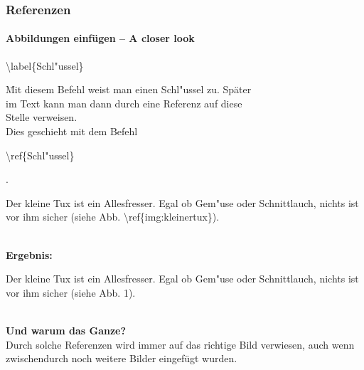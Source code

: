 
\begin{frame}
\frametitle{Referenzen}
\framesubtitle{Abbildungen einfügen – A closer look}
\begin{tabbing}
\begin{ttfamily}\color{nounibaredI}\textbackslash label\color{black}\{Schl"ussel\}\end{ttfamily} \= Mit diesem Befehl weist man einen Schl"ussel zu. Später\\
\> im Text kann man dann durch eine Referenz auf diese\\
\> Stelle verweisen.\\
\> Dies geschieht mit dem Befehl
\begin{ttfamily}\color{nounibaredI}\textbackslash ref\color{black}\{Schl"ussel\}\end{ttfamily}.
\end{tabbing}
\begin{ttfamily}Der kleine Tux ist ein Allesfresser. Egal ob Gem"use oder
Schnittlauch, nichts ist vor ihm sicher (siehe Abb.
\color{nounibaredI}\textbackslash ref\color{black}\{img:kleinertux\}).\end{ttfamily}\\[3mm]
\textbf{Ergebnis:}\\[3mm]
\begin{minipage}{\textwidth}\begin{rm}
Der kleine Tux ist ein Allesfresser. Egal ob Gem"use oder
Schnittlauch, nichts ist vor ihm sicher (siehe Abb.
1).\end{rm} \end{minipage}\\[3mm]
\textbf{Und warum das Ganze?}\\
Durch solche Referenzen wird immer auf das richtige Bild verwiesen, auch wenn zwischendurch noch weitere Bilder eingefügt wurden.
\end{frame}


